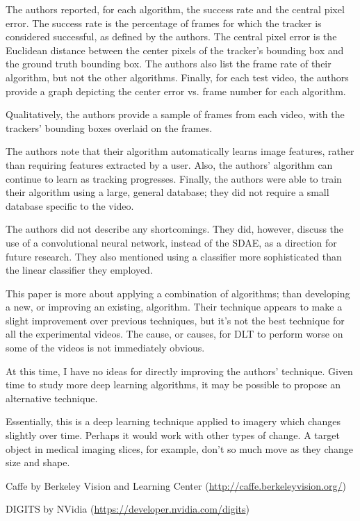 \documentclass[11pt]{article}
\begin{document}
\begin{description}[leftmargin=0in]
        The authors reported, for each algorithm, the success rate and the
        central pixel error. The success rate is the percentage of frames for
        which the tracker is considered successful, as defined by the authors.
        The central pixel error is the Euclidean distance between the center
        pixels of the tracker's bounding box and the ground truth bounding box.
        The authors also list the frame rate of their algorithm, but not the
        other algorithms. Finally, for each test video, the authors provide a
        graph depicting the center error vs. frame number for each algorithm.

        Qualitatively, the authors provide a sample of frames from each video,
        with the trackers' bounding boxes overlaid on the frames.

    \item [Contributions] The authors note that their algorithm automatically
        learns image features, rather than requiring features extracted by a
        user. Also, the authors' algorithm can continue to learn as tracking
        progresses. Finally, the authors were able to train their algorithm
        using a large, general database; they did not require a small database
        specific to the video.

    \item [Shortcomings] The authors did not describe any shortcomings. They
        did, however, discuss the use of a convolutional neural network, instead
        of the SDAE, as a direction for future research. They also mentioned
        using a classifier more sophisticated than the linear classifier they
        employed.

    \item [Self Evaluation] This paper is more about applying a combination of
        algorithms; than developing a new, or improving an existing, algorithm.
        Their technique appears to make a slight improvement over previous
        techniques, but it's not the best technique for all the experimental
        videos. The cause, or causes, for DLT to perform worse on some of the
        videos is not immediately obvious.

    \item [Improvements] At this time, I have no ideas for directly improving
        the authors' technique. Given time to study more deep learning
        algorithms, it may be possible to propose an alternative technique.

    \item [Applications] Essentially, this is a deep learning technique applied
        to imagery which changes slightly over time. Perhaps it would work with
        other types of change. A target object in medical imaging slices, for
        example, don't so much move as they change size and shape.

    \item [Packages]

        Caffe by Berkeley Vision and Learning Center
        (\url{http://caffe.berkeleyvision.org/})

        DIGITS by NVidia (\url{https://developer.nvidia.com/digits})
\end{description}

 
\end{document}
